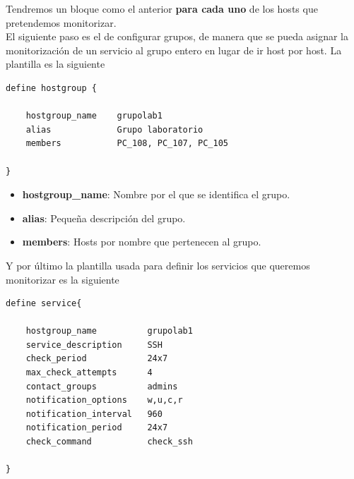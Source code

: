 \documentclass[11pt,a4paper]{article}
\begin{document}
Tendremos un bloque como el anterior \textbf{para cada uno} de los hosts que pretendemos monitorizar.
\\

El siguiente paso es el de configurar grupos, de manera que se pueda asignar la monitorización de un servicio al grupo entero en lugar de ir host por host. La plantilla es la siguiente

\begin{verbatim}
define hostgroup {

    hostgroup_name    grupolab1
    alias             Grupo laboratorio
    members           PC_108, PC_107, PC_105

}
\end{verbatim}

\begin{itemize}
\item \textbf{hostgroup\_name}: Nombre por el que se identifica el grupo.
\item \textbf{alias}: Pequeña descripción del grupo.
\item \textbf{members}: Hosts por nombre que pertenecen al grupo.
\end{itemize}

Y por último la plantilla usada para definir los servicios que queremos monitorizar es la siguiente
\begin{verbatim}
define service{

    hostgroup_name          grupolab1
    service_description     SSH
    check_period            24x7
    max_check_attempts      4
    contact_groups          admins
    notification_options    w,u,c,r
    notification_interval   960
    notification_period     24x7
    check_command           check_ssh
    
}
\end{verbatim}
\end{document}
